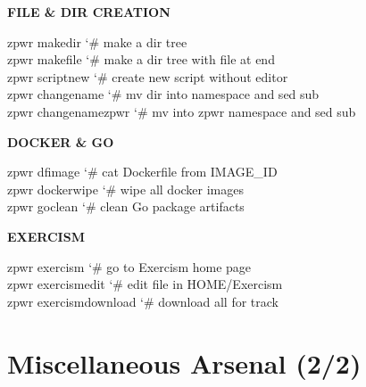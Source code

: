 \documentclass[11pt,a4paper,twoside]{book}
\begin{document}
\vspace{12pt}
{\bfseries\color{neonyellow} FILE \& DIR CREATION}\vspace{4pt}

\begin{codebox}
\color{neongreen}zpwr makedir               {\char`\#} make a dir tree\\
\color{neongreen}zpwr makefile              {\char`\#} make a dir tree with file at end\\
\color{neongreen}zpwr scriptnew             {\char`\#} create new script without editor\\
\color{neongreen}zpwr changename            {\char`\#} mv dir into namespace and sed sub\\
\color{neongreen}zpwr changenamezpwr        {\char`\#} mv into zpwr namespace and sed sub\\
\end{codebox}


\vspace{12pt}
{\bfseries\color{neonyellow} DOCKER \& GO}\vspace{4pt}

\begin{codebox}
\color{neongreen}zpwr dfimage               {\char`\#} cat Dockerfile from IMAGE\_ID\\
\color{neongreen}zpwr dockerwipe            {\char`\#} wipe all docker images\\
\color{neongreen}zpwr goclean               {\char`\#} clean Go package artifacts\\
\end{codebox}


\vspace{12pt}
{\bfseries\color{neonyellow} EXERCISM}\vspace{4pt}

\begin{codebox}
\color{neongreen}zpwr exercism              {\char`\#} go to Exercism home page\\
\color{neongreen}zpwr exercismedit          {\char`\#} edit file in HOME/Exercism\\
\color{neongreen}zpwr exercismdownload      {\char`\#} download all for track\\
\end{codebox}


\vspace{16pt}

\section{Miscellaneous Arsenal (2/2)}
\end{document}
